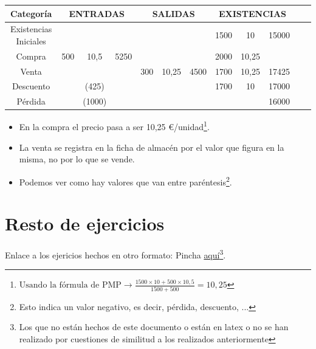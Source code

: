 \documentclass[a4paper,12pt]{article}
\newcommand{\ecuacion}[1]{$#1$}
\begin{document}
\begin{table}[H]
    \centering
    \begin{tabular}{|c|c|c|c|c|c|c|c|c|c|c|c}
        \hline
        \textbf{Categoría}  & \multicolumn{3}{c|}{\textbf{ENTRADAS}} & \multicolumn{3}{c|}{\textbf{SALIDAS}} & \multicolumn{3}{c|}{\textbf{EXISTENCIAS}} \\  \hline
        Existencias Iniciales & & & & & & & 1500 & 10 & 15000\\
        \hline
        Compra & 500 & 10,5 & 5250 & & & & 2000 & 10,25 & \\
        \hline
        Venta & & & & 300 & 10,25 & 4500&1700 &10,25 & 17425\\
        \hline
        Descuento & & (425)& & & & & 1700& 10& 17000\\
        \hline
        Pérdida& & (1000)& & & & & & & 16000\\
        \hline
        
    \end{tabular}    
\end{table}



\begin{itemize}
    \item En la compra el precio pasa a ser 10,25 \euro/unidad\footnote{\ecuacion{\text{Usando la fórmula de PMP} \rightarrow \frac{1500\times10+500\times10,5}{1500+500}=10,25}}.
    \item La venta se registra en la ficha de almacén por el valor que figura en la misma, no por lo que se vende.
    \item Podemos ver como hay valores que van entre paréntesis\footnote{Esto indica un valor negativo, es decir, pérdida, descuento, ...}.
\end{itemize}


\section{Resto de ejercicios}

Enlace a los ejericios hechos en otro formato: Pincha \href{https://github.com/ElblogdeIsmael/ElblogdeIsmael.github.io/blob/main/Asignaturas/Tercer%20A%C3%B1o/CF1/Practica/Tema2/EjerciciosPropuestos/FCCEE/Ejercicios_Propuestos_T2.pdf}{aquí}\footnote{Los que no están hechos de este documento o están en latex o no se han realizado por cuestiones de similitud a los realizados anteriormente}.
\end{document}
